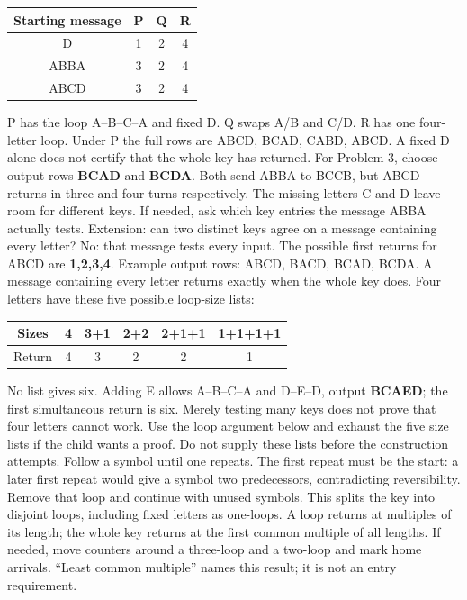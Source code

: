 \documentclass[11pt]{article}
\begin{document}
\begin{center}\renewcommand{\arraystretch}{1.2}\begin{tabular}{c|ccc}Starting message&P&Q&R\\\hline D&1&2&4\\ABBA&3&2&4\\ABCD&3&2&4\end{tabular}\end{center}
P has the loop A--B--C--A and fixed D. Q swaps A/B and C/D. R has one four-letter loop. Under P the full rows are ABCD, BCAD, CABD, ABCD. A fixed D alone does not certify that the whole key has returned.
For Problem 3, choose output rows \textbf{BCAD} and \textbf{BCDA}. Both send ABBA to BCCB, but ABCD returns in three and four turns respectively. The missing letters C and D leave room for different keys. If needed, ask which key entries the message ABBA actually tests. Extension: can two distinct keys agree on a message containing every letter? No: that message tests every input.
The possible first returns for ABCD are \textbf{1,2,3,4}. Example output rows: ABCD, BACD, BCAD, BCDA. A message containing every letter returns exactly when the whole key does. Four letters have these five possible loop-size lists:
\begin{center}\begin{tabular}{c|ccccc}Sizes&4&3+1&2+2&2+1+1&1+1+1+1\\\hline Return&4&3&2&2&1\end{tabular}\end{center}
No list gives six. Adding E allows A--B--C--A and D--E--D, output \textbf{BCAED}; the first simultaneous return is six. Merely testing many keys does not prove that four letters cannot work. Use the loop argument below and exhaust the five size lists if the child wants a proof. Do not supply these lists before the construction attempts.
Follow a symbol until one repeats. The first repeat must be the start: a later first repeat would give a symbol two predecessors, contradicting reversibility. Remove that loop and continue with unused symbols. This splits the key into disjoint loops, including fixed letters as one-loops.
A loop returns at multiples of its length; the whole key returns at the first common multiple of all lengths. If needed, move counters around a three-loop and a two-loop and mark home arrivals. ``Least common multiple'' names this result; it is not an entry requirement.
\end{document}
